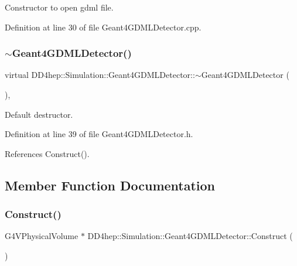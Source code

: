 Constructor to open gdml file. 



Definition at line 30 of file Geant4\+G\+D\+M\+L\+Detector.\+cpp.

\hypertarget{class_d_d4hep_1_1_simulation_1_1_geant4_g_d_m_l_detector_aab64ff1905c8d9dc0374ab8eaeade7eb}{}\label{class_d_d4hep_1_1_simulation_1_1_geant4_g_d_m_l_detector_aab64ff1905c8d9dc0374ab8eaeade7eb} 
\subsubsection{\texorpdfstring{$\sim$\+Geant4\+G\+D\+M\+L\+Detector()}{~Geant4GDMLDetector()}}
{\footnotesize\ttfamily virtual D\+D4hep\+::\+Simulation\+::\+Geant4\+G\+D\+M\+L\+Detector\+::$\sim$\+Geant4\+G\+D\+M\+L\+Detector (\begin{DoxyParamCaption}{ }\end{DoxyParamCaption})\hspace{0.3cm}{\ttfamily [inline]}, {\ttfamily [virtual]}}



Default destructor. 



Definition at line 39 of file Geant4\+G\+D\+M\+L\+Detector.\+h.



References Construct().



\subsection{Member Function Documentation}
\hypertarget{class_d_d4hep_1_1_simulation_1_1_geant4_g_d_m_l_detector_ad7f7c697e1126a85187e06f94cbd4ad1}{}\label{class_d_d4hep_1_1_simulation_1_1_geant4_g_d_m_l_detector_ad7f7c697e1126a85187e06f94cbd4ad1} 
\subsubsection{\texorpdfstring{Construct()}{Construct()}}
{\footnotesize\ttfamily G4\+V\+Physical\+Volume $\ast$ D\+D4hep\+::\+Simulation\+::\+Geant4\+G\+D\+M\+L\+Detector\+::\+Construct (\begin{DoxyParamCaption}{ }\end{DoxyParamCaption})}



